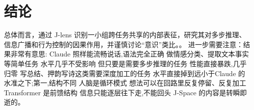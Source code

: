 \documentclass[UTF8,11pt,a4paper]{ctexart}
\begin{document}
\section{结论}
总体而言，通过 J-lens 识别一小组跨任务共享的内部表征，研究其对多步推理、信息广播和行为控制的因果作用，并谨慎讨论“意识”类比。。 进一步需要注意：结果非常有意思: Claude 照样能流畅说话,语法完全正确 做情感分类、提取文本事实等简单任务 水平几乎不受影响 但只要是需要多步推理的任务 性能直接暴跌,几乎归零 写总结、押韵写诗这类需要深度加工的任务 水平直接掉到远小于Claude 的水准之下;第一,结构不同 人脑是循环模式 想法可以在回路里反复停留、反复加工 Transformer 是前馈结构 信息只能逐层往下走,不能回头 J-Space 的内容是转瞬即逝的。
\end{document}
